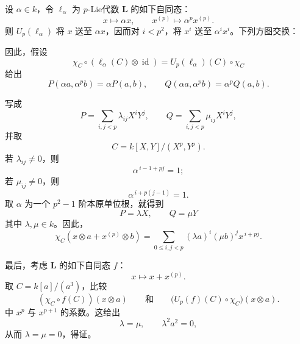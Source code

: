 设 \(\alpha\in k\)，令 \(\ell_\alpha\) 为 \(p\)-Lie代数 \(\mathbf L\) 的如下自同态：
\[
  x\longmapsto\alpha x,
  \qquad
  x^{(p)}\longmapsto\alpha^p x^{(p)}.
\]
则 \(U_p(\ell_\alpha)\) 将 \(x\) 送至 \(\alpha x\)，因而对 \(i<p^2\)，将 \(x^i\) 送至 \(\alpha^i x^i\)。下列方图交换：
\begin{center}
  \label{sga3:VIIB:4.3.2:naturality-endomorphism-square}
  
\end{center}
因此，假设
\[
  \chi_C\circ(\ell_\alpha(C)\otimes\operatorname{id})
  =
  U_p(\ell_\alpha)(C)\circ\chi_C
\]
给出
\[
  P(\alpha a,\alpha^p b)=\alpha P(a,b),
  \qquad
  Q(\alpha a,\alpha^p b)=\alpha^p Q(a,b).
\]

写成
\[
  P=\sum_{i,j<p}\lambda_{ij}X^iY^j,
  \qquad
  Q=\sum_{i,j<p}\mu_{ij}X^iY^j,
\]
并取
\[
  C=k[X,Y]/(X^p,Y^p).
\]
若 \(\lambda_{ij}\ne0\)，则
\[
  \alpha^{\,i-1+pj}=1;
\]
若 \(\mu_{ij}\ne0\)，则
\[
  \alpha^{\,i+p(j-1)}=1.
\]
取 \(\alpha\) 为一个 \(p^2-1\) 阶本原单位根，就得到
\[
  P=\lambda X,
  \qquad
  Q=\mu Y
\]
其中 \(\lambda,\mu\in k\)。因此，
\[
  \chi_C(x\otimes a+x^{(p)}\otimes b)
  =
  \sum_{0\leq i,j<p}
  (\lambda a)^i(\mu b)^j x^{\,i+pj}.
\]

最后，考虑 \(\mathbf L\) 的如下自同态 \(f\)：
\[
  x\longmapsto x+x^{(p)}.
\]
取 \(C=k[a]/(a^3)\)，比较
\[
  (\chi_C\circ f(C))(x\otimes a)
  \qquad\text{和}\qquad
  \bigl(U_p(f)(C)\circ\chi_C\bigr)(x\otimes a).
\]
中 \(x^p\) 与 \(x^{p+1}\) 的系数。这给出
\[
  \lambda=\mu,
  \qquad
  \lambda^2a^2=0,
\]
从而 \(\lambda=\mu=0\)，得证。
